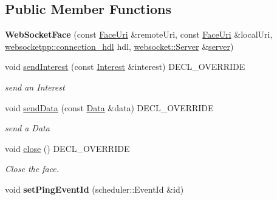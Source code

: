 \subsection*{Public Member Functions}
\begin{DoxyCompactItemize}
\item 
{\bfseries Web\+Socket\+Face} (const \hyperlink{classndn_1_1util_1_1FaceUri}{Face\+Uri} \&remote\+Uri, const \hyperlink{classndn_1_1util_1_1FaceUri}{Face\+Uri} \&local\+Uri, \hyperlink{namespacewebsocketpp_a6b3d26a10ee7229b84b776786332631d}{websocketpp\+::connection\+\_\+hdl} hdl, \hyperlink{classwebsocketpp_1_1server}{websocket\+::\+Server} \&\hyperlink{classwebsocketpp_1_1server}{server})\hypertarget{classnfd_1_1WebSocketFace_ae1aea2354683f7e2a3355fbd6ae148d9}{}\label{classnfd_1_1WebSocketFace_ae1aea2354683f7e2a3355fbd6ae148d9}

\item 
void \hyperlink{classnfd_1_1WebSocketFace_af9be80862667f16eb6fd87b558c77807}{send\+Interest} (const \hyperlink{classndn_1_1Interest}{Interest} \&interest) D\+E\+C\+L\+\_\+\+O\+V\+E\+R\+R\+I\+DE\hypertarget{classnfd_1_1WebSocketFace_af9be80862667f16eb6fd87b558c77807}{}\label{classnfd_1_1WebSocketFace_af9be80862667f16eb6fd87b558c77807}

\begin{DoxyCompactList}\small\item\em send an Interest \end{DoxyCompactList}\item 
void \hyperlink{classnfd_1_1WebSocketFace_ae7cefbcb9c111d0b7db6e2e0430a4cd9}{send\+Data} (const \hyperlink{classndn_1_1Data}{Data} \&data) D\+E\+C\+L\+\_\+\+O\+V\+E\+R\+R\+I\+DE\hypertarget{classnfd_1_1WebSocketFace_ae7cefbcb9c111d0b7db6e2e0430a4cd9}{}\label{classnfd_1_1WebSocketFace_ae7cefbcb9c111d0b7db6e2e0430a4cd9}

\begin{DoxyCompactList}\small\item\em send a Data \end{DoxyCompactList}\item 
void \hyperlink{classnfd_1_1WebSocketFace_a0ac025e3ee1bb270f442697dd4b97bd1}{close} () D\+E\+C\+L\+\_\+\+O\+V\+E\+R\+R\+I\+DE
\begin{DoxyCompactList}\small\item\em Close the face. \end{DoxyCompactList}\item 
void {\bfseries set\+Ping\+Event\+Id} (scheduler\+::\+Event\+Id \&id)\hypertarget{classnfd_1_1WebSocketFace_ae1fdf2e3b41e83e82427edd127321e9a}{}\label{classnfd_1_1WebSocketFace_ae1fdf2e3b41e83e82427edd127321e9a}

\end{DoxyCompactItemize}
